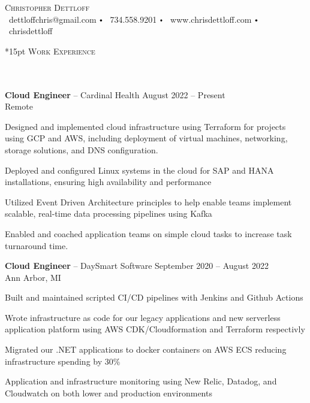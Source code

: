 \documentclass{article}
\newcommand{\contact}[3]{
\vspace*{5pt}
\begin{center}
{\LARGE \scshape {#1}}\\
\vspace{3pt}
#2 
\vspace{2pt}
#3
\end{center}
\vspace*{-8pt}
}
\newcommand{\header}[1]{{
\hspace*{-15pt}\vspace*{6pt} \textsc{#1}} \vspace*{-6pt} 
\lineunder
}
\newcommand{\lineunder}{
\vspace*{-8pt} \\ \hspace*{-18pt} 
\hrulefill \\
}
\newcommand{\employer}[4]{{
\vspace*{2pt}%
\textbf{#1} #2 \hfill #3\\ #4 \vspace*{2pt}}
}
\renewcommand{\labelitemi}{
$\vcenter{\hbox{\tiny$\bullet$}}$\hspace*{3pt}
}
\renewcommand{\labelitemii}{
$\vcenter{\hbox{\tiny$\bullet$}}$\hspace*{-3pt}
}
\newenvironment{bullet-list-minor}{
\begin{list}{\labelitemii}{\setlength\leftmargin{15pt} 
\topsep 0pt \itemsep -2pt}}{\vspace*{4pt}\end{list}
}
\begin{document}
\small
\smallskip
\vspace*{-44pt}

\contact{Christopher Dettloff}
{\faEnvelope\ dettloffchris@gmail.com \labelitemi \faPhone\ 734.558.9201 \labelitemi \faHome\ www.chrisdettloff.com \labelitemi \faGithub\ chrisdettloff }

\vspace*{15pt}%
\header{Work Experience}

    \employer{Cloud Engineer}{-- Cardinal Health}{August 2022 -- Present}{Remote}
	\begin{bullet-list-minor}
	\item Designed and implemented cloud infrastructure using Terraform for projects using GCP and AWS, including deployment of virtual machines, networking, storage solutions, and DNS configuration.
	\vspace{2pt}
	\item Deployed and configured Linux systems in the cloud for SAP and HANA installations, ensuring high availability and performance
    \vspace{2pt}
	\item Utilized Event Driven Architecture principles to help enable teams implement scalable, real-time data processing pipelines using Kafka
    \vspace{2pt}
	\item Enabled and coached application teams on simple cloud tasks to increase task turnaround time.
    \end{bullet-list-minor}
    
    \employer{Cloud Engineer}{-- DaySmart Software}{September 2020 -- August 2022}{Ann Arbor, MI}
    \begin{bullet-list-minor}
    \item Built and maintained scripted CI/CD pipelines with Jenkins and Github Actions
    \vspace{2pt}
    \item Wrote infrastructure as code for our legacy applications and new serverless application platform using AWS CDK/Cloudformation and Terraform respectivly
    \vspace{2pt}
    \item Migrated our .NET applications to docker containers on AWS ECS reducing infrastructure spending by 30\%
    \vspace{2pt}
    \item Application and infrastructure monitoring using New Relic, Datadog, and Cloudwatch on both lower and production environments
    \end{bullet-list-minor}
\end{document}

